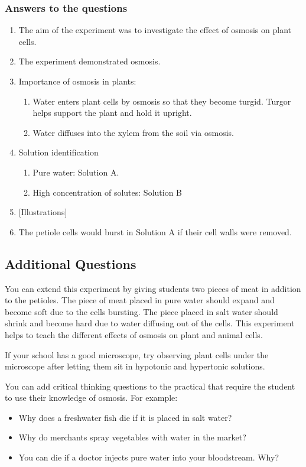 \subsubsection{Answers to the questions}
\begin{enumerate}
\item{The aim of the experiment was to investigate the effect of osmosis on plant cells.}
\item{The experiment demonstrated osmosis.}
\item{Importance of osmosis in plants:}
\begin{enumerate}
\item{Water enters plant cells by osmosis so that they become turgid. Turgor helps support the plant and hold it upright.}
\item{Water diffuses into the xylem from the soil via osmosis.}
\end{enumerate}
\item{Solution identification}
\begin{enumerate}
\item{Pure water: Solution A.}
\item{High concentration of solutes: Solution B}
\end{enumerate}
\item{[Illustrations]}
\item{The petiole cells would burst in Solution A if their cell walls were removed.}
\end{enumerate}

\subsection{Additional Questions}

You can extend this experiment by giving students two pieces of meat in addition to the petioles. The piece of meat placed in pure water should expand and become soft due to the cells bursting. The piece placed in salt water should shrink and become hard due to water diffusing out of the cells. This experiment helps to teach the different effects of osmosis on plant and animal cells.

If your school has a good microscope, try observing plant cells under the microscope after letting them sit in hypotonic and hypertonic solutions. 

You can add critical thinking questions to the practical that require the student to use their knowledge of osmosis. For example:
\begin{itemize}
\item{Why does a freshwater fish die if it is placed in salt water?}
\item{Why do merchants spray vegetables with water in the market?}
\item{You can die if a doctor injects pure water into your bloodstream. Why?}
\end{itemize}


